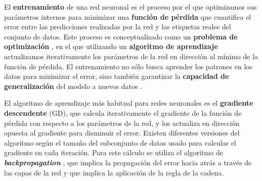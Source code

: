 El \textbf{entrenamiento} de una red neuronal es el proceso por el que optimizamos sus parámetros internos para minimizar una \textbf{función de pérdida} que cuantifica el error entre las predicciones realizadas por la red y las etiquetas reales del conjunto de datos. Este proceso es conceptualizado como un \textbf{problema de optimización} \cite{lecun2015deep}, en el que utilizando un \textbf{algoritmo de aprendizaje} actualizamos iterativamente los parámetros de la red en dirección al mínimo de la función de pérdida. El entrenamiento no sólo busca aprender los patrones en los datos para minimizar el error, sino también garantizar la \textbf{capacidad de generalización} del modelo a nuevos datos \cite{bishop2023learning, GoodFellowBook}.



El algoritmo de aprendizaje más habitual para redes neuronales es el \textbf{gradiente descendente} \cite{ConvexOp, Curry1944GDNoLin} (GD), que calcula iterativamente el gradiente de la función de pérdida con respecto a los parámetros de la red, y los actualiza en dirección opuesta al gradiente para disminuir el error. Existen diferentes versiones del algoritmo según el tamaño del subconjunto de datos usado para calcular el gradiente en cada iteración. Para este cálculo se utiliza el algoritmo de \textit{\textbf{backpropagation}} \cite{rumelbackprop, EffBackProp}, que implica la propagación del error hacia atrás a través de las capas de la red y que implica la aplicación de la regla de la cadena.

